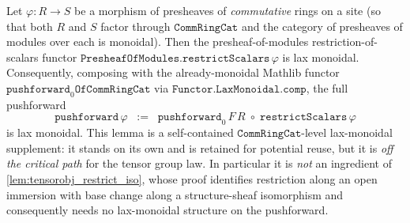 \begin{lemma}\leanok
  \label{lem:restrictscalars_laxmonoidal}
  Let \(\varphi : R \to S\) be a morphism of presheaves of \emph{commutative}
  rings on a site (so that both \(R\) and \(S\) factor through
  \(\mathtt{CommRingCat}\) and the category of presheaves of modules over each
  is monoidal). Then the presheaf-of-modules restriction-of-scalars functor
  \(\mathtt{PresheafOfModules.restrictScalars}\,\varphi\) is lax monoidal.
  Consequently, composing with the already-monoidal Mathlib functor
  \(\mathtt{pushforward}_0\mathtt{OfCommRingCat}\) via
  \(\mathtt{Functor.LaxMonoidal.comp}\), the full pushforward
  \[
    \mathtt{pushforward}\,\varphi
      \;\;:=\;\;
    \mathtt{pushforward}_0\,F\,R \;\circ\; \mathtt{restrictScalars}\,\varphi
  \]
  is lax monoidal. This lemma is a self-contained
  \(\mathtt{CommRingCat}\)-level lax-monoidal supplement: it stands on its own
  and is retained for potential reuse, but it is \emph{off the critical path}
  for the tensor group law. In particular it is \emph{not} an ingredient of
  \cref{lem:tensorobj_restrict_iso}, whose proof identifies restriction along an
  open immersion with base change along a structure-sheaf isomorphism and
  consequently needs no lax-monoidal structure on the pushforward.
\end{lemma}

